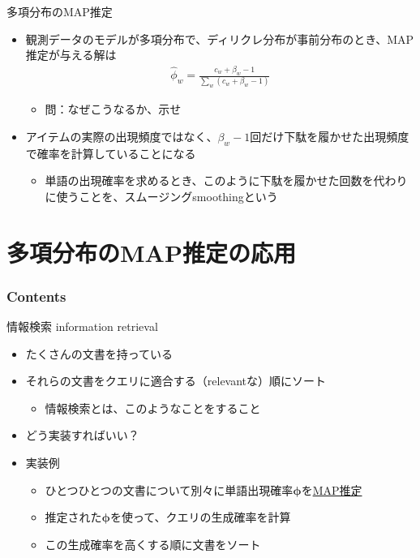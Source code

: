 \documentclass[aspectratio=169,unicode,dvipdfmx,14pt]{beamer}
\begin{document}
\begin{frame}{多項分布のMAP推定}
\begin{itemize}
\item 観測データのモデルが多項分布で、ディリクレ分布が事前分布のとき、MAP推定が与える解は
\begin{align}
\hat{\phi}_w = \frac{c_w + \beta_w - 1}{\sum_w (c_w + \beta_w - 1)} 
\end{align}
\begin{itemize}
\item 問：なぜこうなるか、示せ
\end{itemize}
\item アイテムの実際の出現頻度ではなく、$\beta_w - 1$回だけ下駄を履かせた出現頻度で確率を計算していることになる
\begin{itemize}
\item 単語の出現確率を求めるとき、このように下駄を履かせた回数を代わりに使うことを、スムージングsmoothingという
\end{itemize}
\end{itemize}
\end{frame}


\section{多項分布のMAP推定の応用}

\begin{frame}\frametitle{Contents}
\Large \tableofcontents[currentsection]
\end{frame}

\begin{frame}{情報検索 information retrieval}
\begin{itemize}
\item たくさんの文書を持っている
\item それらの文書をクエリに適合する（relevantな）順にソート
\begin{itemize}
\item 情報検索とは、このようなことをすること
\end{itemize}
\item どう実装すればいい？
\item 実装例
\begin{itemize}
\item ひとつひとつの文書について別々に単語出現確率$\bm{\phi}$を\underline{MAP推定}
\item 推定された$\bm{\phi}$を使って、クエリの生成確率を計算
\item この生成確率を高くする順に文書をソート
\end{itemize}
\end{itemize}
\end{frame}
\end{document}

